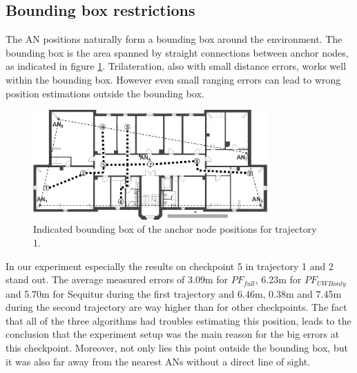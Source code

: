 \subsection{Bounding box restrictions}
The AN positions naturally form a bounding box around the environment. The bounding box is the area spanned by straight connections between anchor nodes, as indicated in figure \ref{fig:trajectory1_boundingBox}. Trilateration, also with small distance errors, works well within the bounding box. However even small ranging errors can lead to wrong position estimations outside the bounding box. 
\begin{figure}[th]
\centering
\includegraphics[width=0.8\textwidth]{Figures/trajectory1_boundingBox}
\decoRule
\caption[Bounding box and checkpoints for trajectory 1 ]{Indicated bounding box of the anchor node positions for trajectory 1.}
\label{fig:trajectory1_boundingBox}
\end{figure}
In our experiment especially the results on checkpoint 5 in trajectory 1 and 2 stand out. The average measured errors of 3.09m for $PF_{full}$, 6.23m for $PF_{UWBonly}$ and 5.70m for Sequitur during the first trajectory and 6.46m,  0.38m and 7.45m during the second trajectory are way higher than for other checkpoints. The fact that all of the three algorithms had troubles estimating this position, leads to the conclusion that the experiment setup was the main reason for the big errors at this checkpoint. Moreover, not only lies this point outside the bounding box, but it was also far away from the nearest ANs without a direct line of sight.


